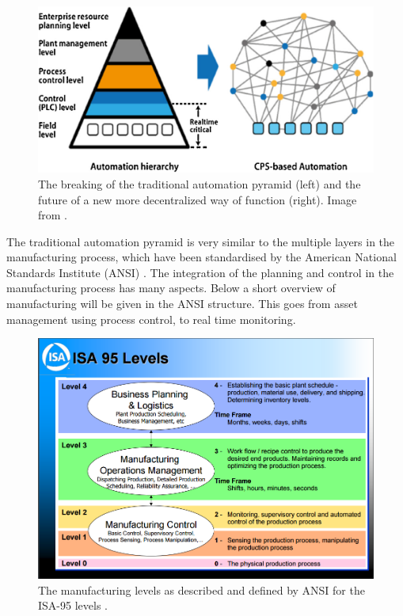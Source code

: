 \begin{figure}[h]
\centering
\includegraphics[width=0.9\linewidth]{"img/traditional automation pyramid1"}
\caption{The breaking of the traditional automation pyramid (left) and the future of a new more decentralized way of function (right). Image from \citep{monostori2016cyber}.}
\label{fig:traditional-automation-pyramid1}
\end{figure}

The traditional automation pyramid is very similar to the multiple layers in the manufacturing process, which have been standardised by the American National Standards Institute (ANSI) \citep{harjunkoski2009integration}. The integration of the planning and control in the manufacturing process has many aspects. Below a short overview of manufacturing will be given in the ANSI structure. This goes from asset management using process control, to real time monitoring.
\begin{figure}[h]
	\centering
	\includegraphics[width=0.9\linewidth]{img/ansi-isa-95}
	\caption{The manufacturing levels as described and defined by ANSI for the ISA-95 levels \citep{brandl2008ISA}. }
	\label{fig:ansi-isa-95}
\end{figure}

